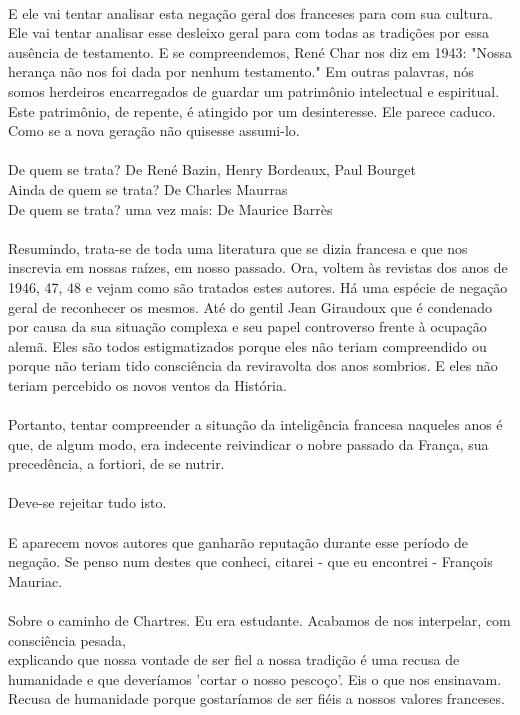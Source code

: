 \documentclass[10pt,a4paper]{book}
\begin{document}
	\\
	E ele vai tentar analisar esta negação geral dos franceses para com sua cultura. Ele vai tentar analisar esse desleixo geral para com todas as tradições por essa ausência de testamento. E se  compreendemos, René Char nos diz em 1943: "Nossa herança não nos foi dada por nenhum testamento." Em outras palavras, nós somos herdeiros encarregados de  guardar um patrimônio intelectual e espiritual. Este patrimônio, de repente, é atingido por um desinteresse. Ele parece caduco. Como se a nova geração não quisesse assumi-lo.\\
	\\
	De quem se trata? De René Bazin, Henry Bordeaux, Paul Bourget\\
	Ainda de quem se trata? De Charles Maurras\\
	De quem se trata? uma vez mais: De Maurice Barrès\\
	\\
	Resumindo, trata-se de toda uma literatura que se dizia francesa e que nos inscrevia em nossas raízes, em nosso passado. Ora, voltem às revistas dos anos de 1946, 47, 48 e vejam como são tratados estes autores. Há uma espécie de negação geral de reconhecer os mesmos. Até do gentil Jean Giraudoux que é condenado por causa da sua situação complexa e seu papel controverso frente à ocupação alemã. Eles são todos estigmatizados porque eles não teriam compreendido ou porque não teriam tido consciência da reviravolta dos anos sombrios. E eles não teriam percebido os novos ventos da História.\\
	\\
	Portanto, tentar compreender a situação da inteligência francesa naqueles anos é que, de algum modo, era indecente reivindicar o nobre passado da França, sua precedência, a fortiori, de se nutrir.\\
	\\
	Deve-se rejeitar tudo isto.\\
	\\
	E aparecem novos autores que ganharão reputação durante esse período de negação. Se penso num destes que conheci, citarei - que eu encontrei - François Mauriac. \\
	\\
	Sobre o caminho de Chartres. Eu era estudante. Acabamos de nos interpelar, com consciência pesada,\\
	explicando que nossa vontade de ser fiel a nossa tradição é uma recusa de humanidade e que deveríamos 'cortar o nosso pescoço'. Eis o que nos ensinavam. Recusa de humanidade porque gostaríamos de ser fiéis a nossos valores franceses.\\
\end{document}

